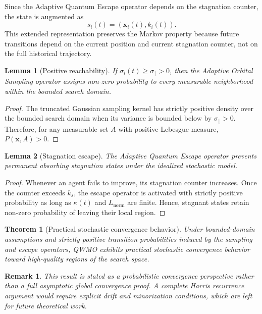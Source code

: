\documentclass[final,5p,times,twocolumn]{elsarticle}
\newtheorem{lemma}{Lemma}
\newtheorem{theorem}{Theorem}
\newtheorem{remark}{Remark}
\begin{document}
Since the Adaptive Quantum Escape operator depends on the
stagnation counter, the state is augmented as
\begin{equation}
s_i(t)=(\mathbf{x}_i(t),k_i(t)).
\end{equation}
This extended representation preserves the Markov property
because future transitions depend on the current position and
current stagnation counter, not on the full historical trajectory.

\begin{lemma}[Positive reachability]
If $\sigma_i(t)\geq \sigma_{\lfloor}>0$, then the Adaptive
Orbital Sampling operator assigns non-zero probability to
every measurable neighborhood within the bounded search domain.
\end{lemma}

\begin{proof}
The truncated Gaussian sampling kernel has strictly positive
density over the bounded search domain when its variance is
bounded below by $\sigma_{\lfloor}>0$. Therefore, for any
measurable set $A$ with positive Lebesgue measure,
$P(\mathbf{x},A)>0$.
\end{proof}

\begin{lemma}[Stagnation escape]
The Adaptive Quantum Escape operator prevents permanent
absorbing stagnation states under the idealized stochastic
model.
\end{lemma}

\begin{proof}
Whenever an agent fails to improve, its stagnation counter
increases. Once the counter exceeds $k_s$, the escape operator
is activated with strictly positive probability as long as
$\kappa(t)$ and $L_{\mathrm{norm}}$ are finite. Hence, stagnant
states retain non-zero probability of leaving their local region.
\end{proof}

\begin{theorem}[Practical stochastic convergence behavior]
Under bounded-domain assumptions and strictly positive
transition probabilities induced by the sampling and escape
operators, QWMO exhibits practical stochastic convergence
behavior toward high-quality regions of the search space.
\end{theorem}

\begin{remark}
This result is stated as a probabilistic convergence perspective
rather than a full asymptotic global convergence proof. A complete
Harris recurrence argument would require explicit drift and
minorization conditions, which are left for future theoretical work.
\end{remark}
\end{document}
